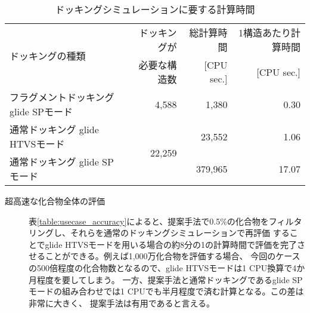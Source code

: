 \begin{table}[htbp] \centering
	\caption{ドッキングシミュレーションに要する計算時間}
	\label{table:usecase_speed}
	\begin{tabular}{l|rrr}
	\hline
	\multirow{2}{*}{ドッキングの種類}		&ドッキングが			&総計算時間	&1構造あたり計算時間	\\ 
									&必要な構造数		&[CPU sec.]			&[CPU sec.]			\\ \hline
	フラグメントドッキング glide SPモード		&4,588				&1,380				&0.30				\\
	通常ドッキング glide HTVSモード		&\multirow{2}{*}{22,259}	&23,552				&1.06				\\
	通常ドッキング glide SPモード			&					&379,965				&17.07				\\ \hline
	\end{tabular}
\end{table}


\begin{description}
\item[超高速な化合物全体の評価]
	表\ref{table:usecase_accuracy}によると、提案手法で0.5\%の化合物をフィルタリングし、それらを通常のドッキングシミュレーションで再評価
	することでglide HTVSモードを用いる場合の約8分の1の計算時間で評価を完了させることができる。例えば1,000万化合物を評価する場合、
	今回のケースの500倍程度の化合物数となるので、glide HTVSモードは1 CPU換算で4か月程度を要してしまう。
	一方、提案手法と通常ドッキングであるglide SPモードの組み合わせでは1 CPUでも半月程度で済む計算となる。この差は非常に大きく、
	提案手法は有用であると言える。
\end{description}
